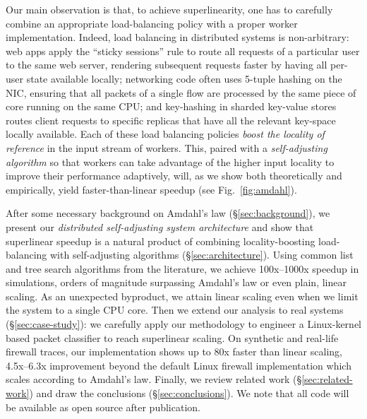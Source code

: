 Our main observation is that, to achieve superlinearity, one has to carefully combine an appropriate load-balancing policy with a proper worker implementation. Indeed, load balancing in distributed systems is non-arbitrary: web apps apply the ``sticky sessions'' rule to route all requests of a particular user to the same web server, rendering subsequent requests faster by having all per-user state available locally; networking code often uses 5-tuple hashing on the NIC, ensuring that all packets of a single flow are processed by the same piece of core running on the same CPU; and key-hashing in sharded key-value stores routes client requests to specific replicas that have all the relevant key-space locally available. Each of these load balancing policies \emph{boost the locality of reference} in the input stream of workers. This, paired with a \emph{self-adjusting algorithm} so that workers can take advantage of the higher input locality to improve their performance adaptively, will, as we show both theoretically and empirically, yield faster-than-linear speedup (see Fig.~\ref{fig:amdahl}). %

After some necessary background on Amdahl's law (\S\ref{sec:background}), we present our \emph{distributed self-adjusting system architecture} and show that superlinear speedup is a natural product of combining locality-boosting load-balancing with self-adjusting algorithms (\S\ref{sec:architecture}). Using common list and tree search algorithms from the literature, we achieve 100x--1000x speedup in simulations, orders of magnitude surpassing Amdahl's law or even plain, linear scaling. As an unexpected byproduct, we attain linear scaling even when we limit the system to a single CPU core. Then we extend our analysis to real systems (\S\ref{sec:case-study}): we carefully apply our methodology to engineer a Linux-kernel based packet classifier to reach superlinear scaling. On synthetic and real-life firewall traces, our implementation shows up to 80x faster than linear scaling, 4.5x--6.3x improvement beyond the default Linux firewall implementation which scales according to Amdahl's law. Finally, we review related work (\S\ref{sec:related-work}) and draw the conclusions (\S\ref{sec:conclusions}). We note that all code will be available as open source after publication.


